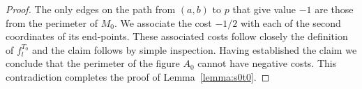 \documentclass{article}\usepackage[a4paper,margin=20mm]{geometry}
\begin{document}
\begin{proof}
The only edges on the path from $(a,b)$ to $p$ that
give value $-1$ are those from the perimeter of $M_0$.  
We associate the cost $-1/2$ with each of the second
coordinates of its end-points.  These associated costs follow
closely the definition
of $f_l^{T_0}$ and the claim follows
by simple inspection.  Having established the claim we conclude
that the perimeter of the figure $A_0$ cannot have negative
costs.  This contradiction completes the proof of
Lemma~\ref{lemma:s0t0}.
\end{proof}
\end{document}
